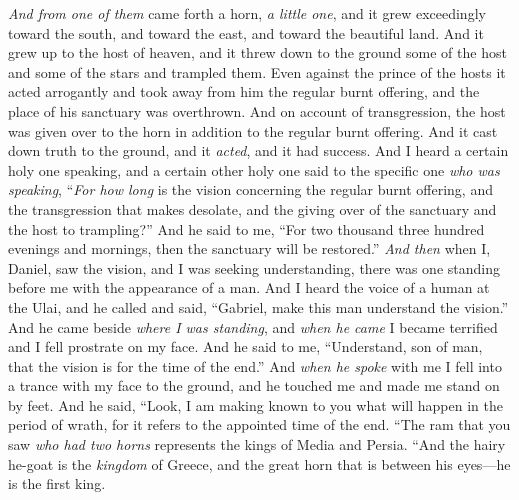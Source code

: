 \begin{biblechapter}
\verse \textit{And from one of them} came forth a horn, \textit{a little one}, and it grew exceedingly toward the south, and toward the east, and toward the beautiful land.
\verse And it grew up to the host of heaven, and it threw down to the ground some of the host and some of the stars and trampled them.
\verse Even against the prince of the hosts it acted arrogantly and took away from him the regular burnt offering, and the place of his sanctuary was overthrown.
\verse And on account of transgression, the host was given over to the horn in addition to the regular burnt offering. And it cast down truth to the ground, and it \textit{acted}, and it had success.
\verse And I heard a certain holy one speaking, and a certain other holy one said to the specific one \textit{who was speaking}, “\textit{For how long} is the vision concerning the regular burnt offering, and the transgression that makes desolate, and the giving over of the sanctuary and the host to trampling?”
\verse And he said to me, “For two thousand three hundred evenings and mornings, then the sanctuary will be restored.”
 \textit{And then} when I, Daniel, saw the vision, and I was seeking understanding, there was one standing before me with the appearance of a man.
\verse And I heard the voice of a human at the Ulai, and he called and said, “Gabriel, make this man understand the vision.”
\verse And he came beside \textit{where I was standing}, and \textit{when he came} I became terrified and I fell prostrate on my face. And he said to me, “Understand, son of man, that the vision is for the time of the end.”
\verse And \textit{when he spoke} with me I fell into a trance with my face to the ground, and he touched me and made me stand on by feet.
\verse And he said, “Look, I am making known to you what will happen in the period of wrath, for it refers to the appointed time of the end.
\verse “The ram that you saw \textit{who had two horns} represents the kings of Media and Persia.
\verse “And the hairy he-goat is the \textit{kingdom} of Greece, and the great horn that is between his eyes—he is the first king.

\end{biblechapter}
